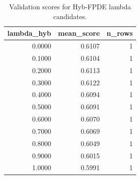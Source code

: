 \begin{table}[t]
\caption{Validation scores for Hyb-FPDE lambda candidates.}
\label{tab:lambda_distribution_computed}
\centering
\begin{tabular}{rrr}
\toprule
lambda\_hyb & mean\_score & n\_rows \\
\midrule
0.0000 & 0.6107 & 1 \\
0.1000 & 0.6104 & 1 \\
0.2000 & 0.6113 & 1 \\
0.3000 & 0.6122 & 1 \\
0.4000 & 0.6094 & 1 \\
0.5000 & 0.6091 & 1 \\
0.6000 & 0.6070 & 1 \\
0.7000 & 0.6069 & 1 \\
0.8000 & 0.6049 & 1 \\
0.9000 & 0.6015 & 1 \\
1.0000 & 0.5991 & 1 \\
\bottomrule
\end{tabular}

\end{table}
